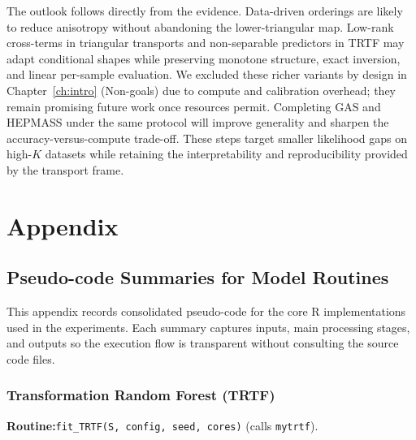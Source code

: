 \documentclass[11pt,a4paper,twoside]{book}\usepackage[]{graphicx}\usepackage[]{xcolor}
\begin{document}
The outlook follows directly from the evidence. Data-driven orderings are likely to reduce anisotropy without abandoning the lower-triangular map. Low-rank cross-terms in triangular transports and non-separable predictors in TRTF may adapt conditional shapes while preserving monotone structure, exact inversion, and linear per-sample evaluation. We excluded these richer variants by design in Chapter~\ref{ch:intro} (Non-goals) due to compute and calibration overhead; they remain promising future work once resources permit. Completing GAS and HEPMASS under the same protocol will improve generality and sharpen the accuracy-versus-compute trade-off. These steps target smaller likelihood gaps on high-$K$ datasets while retaining the interpretability and reproducibility provided by the transport frame.





\appendix




\chapter{Appendix}\label{ch:appendix}

\section{Pseudo-code Summaries for Model Routines}

This appendix records consolidated pseudo-code for the core R implementations used in the experiments. Each summary captures inputs, main processing stages, and outputs so the execution flow is transparent without consulting the source code files.

\subsection{Transformation Random Forest (TRTF)}\label{app:trtf}

\textbf{Routine:}\quad\texttt{fit\_TRTF(S, config, seed, cores)} (calls \texttt{mytrtf}).
\end{document}
